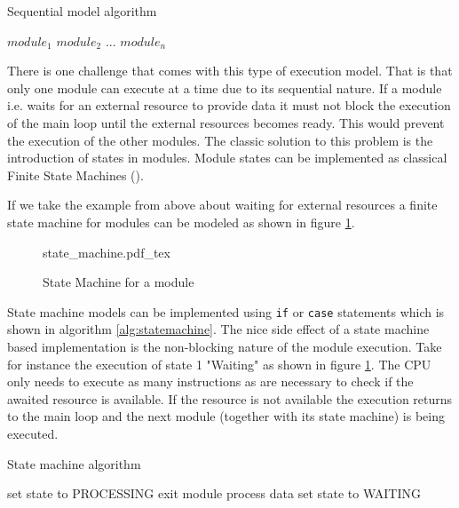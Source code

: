 \begin{algorithm}[H]
\caption{Sequential model algorithm}
\label{alg:sequential execution}
\begin{algorithmic}
\STATE $module_1$
\STATE $module_2$
\STATE $...$
\STATE $module_n$
\ENDWHILE
\end{algorithmic}
\end{algorithm}

There is one challenge that comes with this type of execution model. That is that only one module can execute at a time due to its sequential nature. If a module i.e. waits for an external resource to provide data it must not block the execution of the main loop until the external resources becomes ready. This would prevent the execution of the other modules. The classic solution to this problem is the introduction of states in modules. Module states can be implemented as classical Finite State Machines (\cite{booth}).

If we take the example from above about waiting for external resources a finite state machine for modules can be modeled as shown in figure \ref{fig:statemachine}.
\begin{figure}[H]
\centering
{state_machine.pdf_tex}
\caption{State Machine for a module}
\label{fig:statemachine}
\end{figure}

State machine models can be implemented using \texttt{if} or \texttt{case} statements which is shown in algorithm \ref{alg:statemachine}. The nice side effect of a state machine based implementation is the non-blocking nature of the module execution. Take for instance the execution of state 1 "Waiting" as shown in figure \ref{fig:statemachine}. The CPU only needs to execute as many instructions as are necessary to check if the awaited resource is available. If the resource is not available the execution returns to the main loop and the next module (together with its state machine) is being executed.

\begin{algorithm}[H]
\caption{State machine algorithm}
\label{alg:statemachine}
\begin{algorithmic}
        \STATE set state to PROCESSING
    \ELSE
        \STATE exit module
    \ENDIF
{}
    \STATE process data
    \STATE set state to WAITING
\ENDIF
\end{algorithmic}
\end{algorithm}

